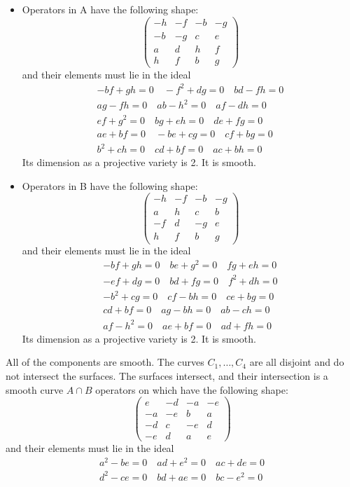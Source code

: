 \documentclass{amsart}
\begin{document}
\begin{itemize}
\item
Operators in A have the following shape:
$$\left(\begin{array}{rrrr}
-h & -f & -b & -g \\
-b & -g & c & e \\
a & d & h & f \\
h & f & b & g
\end{array}\right)$$
and their elements must lie in the ideal \begin{align*}
-b f + g h = 0 \quad
-f^{2} + d g = 0 \quad
b d - f h = 0 \\
a g - f h = 0 \quad
a b - h^{2} = 0 \quad
a f - d h = 0 \\
e f + g^{2} = 0 \quad
b g + e h = 0 \quad
d e + f g = 0 \\
a e + b f = 0 \quad
-b e + c g = 0 \quad
c f + b g = 0 \\
b^{2} + c h = 0 \quad
c d + b f = 0 \quad
a c + b h = 0 
\end{align*}
Its dimension as a projective variety is 2.
It is smooth.

\item
Operators in B have the following shape:
$$\left(\begin{array}{rrrr}
-h & -f & -b & -g \\
a & h & c & b \\
-f & d & -g & e \\
h & f & b & g
\end{array}\right)$$
and their elements must lie in the ideal \begin{align*}
-b f + g h = 0 \quad
b e + g^{2} = 0 \quad
f g + e h = 0 \\
-e f + d g = 0 \quad
b d + f g = 0 \quad
f^{2} + d h = 0 \\
-b^{2} + c g = 0 \quad
c f - b h = 0 \quad
c e + b g = 0 \\
c d + b f = 0 \quad
a g - b h = 0 \quad
a b - c h = 0 \\
a f - h^{2} = 0 \quad
a e + b f = 0 \quad
a d + f h = 0 
\end{align*}
Its dimension as a projective variety is 2.
It is smooth.

\end{itemize}




All of the components are smooth. The curves $C_1, \ldots, C_4$ are all disjoint and do not intersect the surfaces. The surfaces intersect, and their intersection is a smooth curve $A \cap B$ operators on which have the following shape:
$$\left(\begin{array}{rrrr}
e & -d & -a & -e \\
-a & -e & b & a \\
-d & c & -e & d \\
-e & d & a & e
\end{array}\right)$$
and their elements must lie in the ideal \begin{align*}
a^{2} - b e = 0 \quad
a d + e^{2} = 0 \quad
a c + d e = 0 \\
d^{2} - c e = 0 \quad
b d + a e = 0 \quad
b c - e^{2} = 0 
\end{align*}
\end{document}
